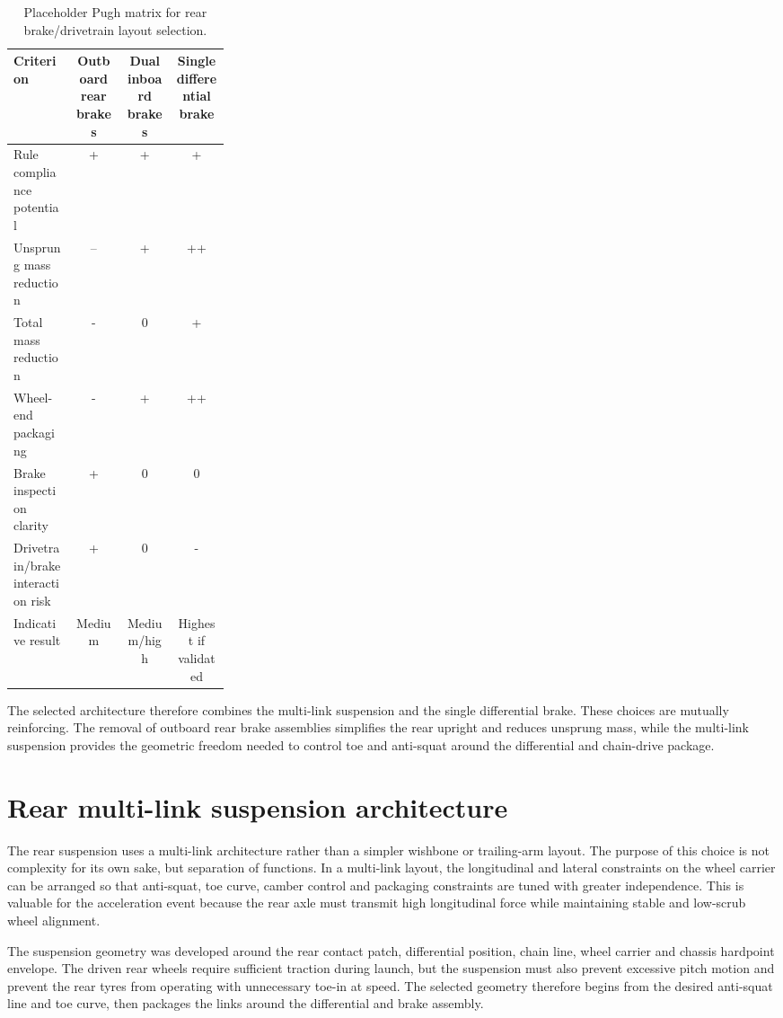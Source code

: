 \begin{table}[H]
\caption{Placeholder Pugh matrix for rear brake/drivetrain layout selection.}
\label{tab:pugh_brake}
\centering
\begin{tabular}{p{0.28\linewidth}c c c}
\toprule
Criterion & Outboard rear brakes & Dual inboard brakes & Single differential brake \\
\midrule
Rule compliance potential & + & + & + \\
Unsprung mass reduction & -- & + & ++ \\
Total mass reduction & - & 0 & + \\
Wheel-end packaging & - & + & ++ \\
Brake inspection clarity & + & 0 & 0 \\
Drivetrain/brake interaction risk & + & 0 & - \\
\midrule
Indicative result & Medium & Medium/high & Highest if validated \\
\bottomrule
\end{tabular}
\end{table}

The selected architecture therefore combines the multi-link suspension and the single differential brake. These choices are mutually reinforcing. The removal of outboard rear brake assemblies simplifies the rear upright and reduces unsprung mass, while the multi-link suspension provides the geometric freedom needed to control toe and anti-squat around the differential and chain-drive package.

\section{Rear multi-link suspension architecture}

The rear suspension uses a multi-link architecture rather than a simpler wishbone or trailing-arm layout. The purpose of this choice is not complexity for its own sake, but separation of functions. In a multi-link layout, the longitudinal and lateral constraints on the wheel carrier can be arranged so that anti-squat, toe curve, camber control and packaging constraints are tuned with greater independence. This is valuable for the acceleration event because the rear axle must transmit high longitudinal force while maintaining stable and low-scrub wheel alignment.

The suspension geometry was developed around the rear contact patch, differential position, chain line, wheel carrier and chassis hardpoint envelope. The driven rear wheels require sufficient traction during launch, but the suspension must also prevent excessive pitch motion and prevent the rear tyres from operating with unnecessary toe-in at speed. The selected geometry therefore begins from the desired anti-squat line and toe curve, then packages the links around the differential and brake assembly.

